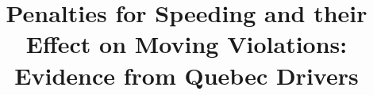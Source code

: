 \documentclass[proof]{cje}
\begin{document}
\label{firstpage}

\title[Penalties for Speeding and their Effect on Moving Violations]{Penalties for Speeding and their Effect on Moving Violations: Evidence from Quebec Drivers}







%
%                  
%


\abstract{

         

         }

%
%        
%


\maketitle
















% 


\vfill
\eject


\clearpage

% 


%
%
%
%

\end{document}
